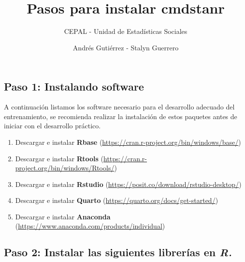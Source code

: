 \documentclass[
  letterpaper,
  DIV=11,
  numbers=noendperiod]{scrartcl}
\title{Pasos para instalar cmdstanr}
\subtitle{CEPAL - Unidad de Estadísticas Sociales}
\author{Andrés Gutiérrez - Stalyn Guerrero}
\date{}
\providecommand{\tightlist}{%
  \setlength{\itemsep}{0pt}\setlength{\parskip}{0pt}}\usepackage{longtable,booktabs,array}
\begin{document}
\maketitle
\ifdefined\Shaded\renewenvironment{Shaded}{\begin{tcolorbox}[interior hidden, borderline west={3pt}{0pt}{shadecolor}, enhanced, boxrule=0pt, sharp corners, breakable, frame hidden]}{\end{tcolorbox}}\fi

\hypertarget{paso-1-instalando-software}{%
\subsection{Paso 1: Instalando
software}\label{paso-1-instalando-software}}

A continuación listamos los software necesario para el desarrollo
adecuado del entrenamiento, se recomienda realizar la instalación de
estos paquetes antes de iniciar con el desarrollo práctico.

\begin{enumerate}
\def\labelenumi{\arabic{enumi}.}
\tightlist
\item
  Descargar e instalar \textbf{Rbase}
  (\url{https://cran.r-project.org/bin/windows/base/})
\item
  Descargar e instalar \textbf{Rtools}
  (\url{https://cran.r-project.org/bin/windows/Rtools/})
\item
  Descargar e instalar \textbf{Rstudio}
  (\url{https://posit.co/download/rstudio-desktop/})
\item
  Descargar e instalar \textbf{Quarto}
  (\url{https://quarto.org/docs/get-started/})
\item
  Descargar e instalar \textbf{Anaconda}
  (\url{https://www.anaconda.com/products/individual})
\end{enumerate}

\hypertarget{paso-2-instalar-las-siguientes-libreruxedas-en-r.}{%
\subsection{\texorpdfstring{Paso 2: Instalar las siguientes librerías en
\emph{R.}}{Paso 2: Instalar las siguientes librerías en R.}}\label{paso-2-instalar-las-siguientes-libreruxedas-en-r.}}
\end{document}
